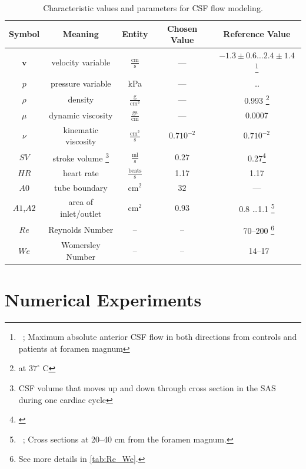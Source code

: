 \begin{table}\begin{minipage}{\textwidth}\begin{center}
    \begin{tabular}{ | c | c | c | c | c | }
    \hline
    Symbol & Meaning & Entity & Chosen Value & Reference Value\\ \hline\hline
	$\mathbf{v}$	& velocity variable & $\mathrm{ \frac{cm}{s}}$ & --- & $-1.3\pm 0.6 \ldots 2.4 \pm 1.4$ \footnote{~\cite{HofmannWarmuth-MetzBendszusEtAl2000}; Maximum absolute anterior CSF flow in both directions from controls and patients at foramen magnum} \\
	$p$		& pressure	variable & kPa & --- & \ldots\\
	$\rho$	& density & $\mathrm{\frac{g}{cm^3}}$ & --- &0.993 \footnote{at $37^\circ$ C }\\ %
	$\mu$	& dynamic viscosity	&  $\mathrm{\frac{g s}{cm}}$ & --- & 0.0007\\
	$\nu$	& kinematic viscosity & $\mathrm{ \frac{cm^2}{s}}$ & $0.7 10^{-2}$ & $0.7 10^{-2}$ \\ 	\hline %
	$SV$	& stroke volume \footnote{CSF volume that moves up and down through cross section in the SAS during one cardiac cycle}	& $\mathrm{ \frac{ml}{s}}$& $0.27$  & $0.27$\footnote{\cite{GuptaSoellingerBoesigerEtAl2009}} \\
	$HR$	& heart rate & $\mathrm{\frac{beats}{s}}$	& 1.17 & 1.17\\
	$A0$	& tube boundary	& $\mathrm{ cm^2}$ & $32$  & ---\\
	$A1$,$A2$	& area of inlet/outlet & $\mathrm{ cm^2}$ &$0.93$ & 0.8 \ldots 1.1 \footnote{~\cite{Lopes2007}; Cross sections at 20--40 cm from the foramen magnum.}  \\
    \hline
    $Re$    & Reynolds Number & -- & -- & ~70--200 \footnote{See more details in \ref{tab:Re_We}.}\\
    $We$    & Womersley Number & -- & -- & ~14--17 \\
    \hline
    \end{tabular}
	\label{tab:entities}
	\caption{Characteristic values and parameters for CSF flow modeling.}
\end{center}\end{minipage}\end{table}

\section{Numerical Experiments}
